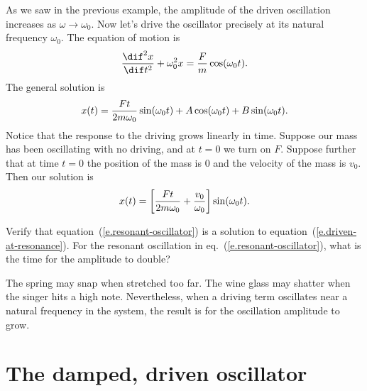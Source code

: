 As we saw in the previous example, the amplitude of the driven oscillation increases as $\omega\to\omega_{0}$.  Now let's drive the oscillator precisely at its natural frequency $\omega_{0}$.  The equation of motion is
\begin{equation}\label{e.driven-at-resonance}
	\DDtt{x} + \omega_{0}^{2}x = \frac{F}{m}\cos(\omega_{0}t).
\end{equation}
The general solution is
\[
	x(t) = \frac{Ft}{2m\omega_{0}}\sin(\omega_{0} t) + A\cos(\omega_{0} t) + B\sin(\omega_{0} t).
\]
Notice that the response to the driving grows linearly in time. Suppose our mass has been oscillating with no driving, and at $t=0$ we turn on $F$.  Suppose further that at time $t=0$ the position of the mass is $0$ and the velocity of the mass is $v_{0}$.  Then our solution is
\begin{equation}\label{e.resonant-oscillator}
	x(t) = \left[\frac{Ft}{2m\omega_{0}} + \frac{v_{0}}{\omega_{0}}\right]\sin(\omega_{0} t).
\end{equation}

\begin{exercisebox}
Verify that equation~(\ref{e.resonant-oscillator}) is a solution to equation~(\ref{e.driven-at-resonance}).  For the resonant oscillation in eq.~(\ref{e.resonant-oscillator}), what is the time for the amplitude to double?
\end{exercisebox}

 The spring may snap when stretched too far. The wine glass may shatter when the singer hits a high note. Nevertheless, when a driving term oscillates near a natural frequency in the system, the result is for the oscillation amplitude to grow.
\section{The damped, driven oscillator}

